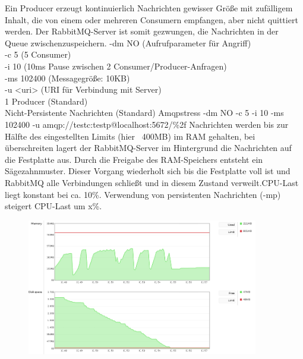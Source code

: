 \documentclass[	a4paper,
			11pt,
			titlepage,
			oneside,
			fleqn,
			listof=totoc,
			parskip,
			chapterprefix=false,
			numbers=noenddot]{scrartcl}
\begin{document}
\clearpage
		{Ein Producer erzeugt kontinuierlich Nachrichten gewisser Größe mit zufälligem Inhalt, die von einem oder mehreren Consumern empfangen, aber nicht quittiert werden.%
		 Der RabbitMQ-Server ist somit gezwungen, die Nachrichten in der Queue zwischenzuspeichern.}%
		{%
		 -dm NO (Aufrufparameter für Angriff) \\
		 -c 5 (5 Consumer) \\
		 -i 10 (10ms Pause zwischen 2 Consumer/Producer-Anfragen) \\
		 -ms 102400 (Messagegröße: 10KB) \\
		 -u <uri> (URI für Verbindung mit Server) \\
		 1 Producer (Standard) \\
		 Nicht-Persistente Nachrichten (Standard)
		}%
		{Amqpstress -dm NO -c 5 -i 10 -ms 102400 -u amqp://testc:testp@localhost:5672/\%2f}%
		{Nachrichten werden bis zur Hälfte des eingestellten Limits (hier ~400MB) im RAM gehalten, bei überschreiten lagert der RabbitMQ-Server im Hintergrund die Nachrichten auf die Festplatte aus. Durch die Freigabe des RAM-Speichers entsteht ein Sägezahnmuster. Dieser Vorgang wiederholt sich bis die Festplatte voll ist und RabbitMQ alle Verbindungen schließt und in diesem Zustand verweilt.CPU-Last liegt konstant bei ca. 10\%.}%
		{Verwendung von persistenten Nachrichten (-mp) steigert CPU-Last um x\%.}
		
		\begin{figure}[!htb]
			\centering
			\includegraphics[width=0.9\textwidth]{img/noResp/history_RAM_HDD.png}
		\end{figure}
	
\end{document}
